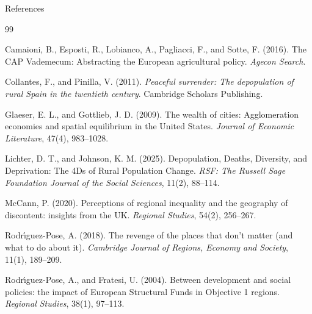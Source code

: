 \documentclass[aspectratio=169]{beamer}
\begin{document}
\begin{frame}[allowframebreaks]{References}
\scriptsize
\begin{thebibliography}{99}

Camaioni, B., Esposti, R., Lobianco, A., Pagliacci, F., and Sotte, F. (2016).
The CAP Vademecum: Abstracting the European agricultural policy.
\textit{Agecon Search}.

Collantes, F., and Pinilla, V. (2011).
\textit{Peaceful surrender: The depopulation of rural Spain in the twentieth century}.
Cambridge Scholars Publishing.

Glaeser, E. L., and Gottlieb, J. D. (2009).
The wealth of cities: Agglomeration economies and spatial equilibrium in the United States.
\textit{Journal of Economic Literature}, 47(4), 983--1028.

Lichter, D. T., and Johnson, K. M. (2025).
Depopulation, Deaths, Diversity, and Deprivation: The 4Ds of Rural Population Change.
\textit{RSF: The Russell Sage Foundation Journal of the Social Sciences}, 11(2), 88--114.

McCann, P. (2020).
Perceptions of regional inequality and the geography of discontent: insights from the UK.
\textit{Regional Studies}, 54(2), 256--267.

Rodr\'{\i}guez-Pose, A. (2018).
The revenge of the places that don't matter (and what to do about it).
\textit{Cambridge Journal of Regions, Economy and Society}, 11(1), 189--209.

Rodr\'{\i}guez-Pose, A., and Fratesi, U. (2004).
Between development and social policies: the impact of European Structural Funds in Objective 1 regions.
\textit{Regional Studies}, 38(1), 97--113.

\end{thebibliography}
\end{frame}
\end{document}
